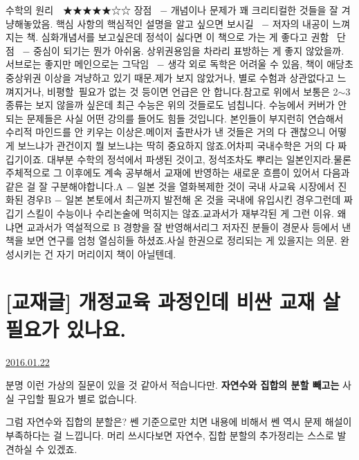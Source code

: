 수학의 원리  ★★★★★☆☆
장점  $-$ 개념이나 문제가 꽤 크리티컬한 것들을 잘 겨냥해놓았음. 핵심 사항의 핵심적인 설명을 알고 싶으면 보시길  $-$ 저자의 내공이 느껴지는 책. 심화개념서를 보고싶은데 정석이 싫다면 이 책으로 가는 게 좋다고 권함  단점  $-$ 중심이 되기는 뭔가 아쉬움. 상위권용임을 차라리 표방하는 게 좋지 않았을까. 서브로는 좋지만 메인으로는 그닥임  $-$ 생각 외로 독학은 어려울 수 있음, 책이 애당초 중상위권 이상을 겨냥하고 있기 때문.제가 보지 않았거나, 별로 수험과 상관없다고 느껴지거나, 비평할 필요가 없는 것 등이면 언급은 안 합니다.참고로 위에서 보통은 2$\sim$3 종류는 보지 않을까 싶은데 최근 수능은 위의 것들로도 넘칩니다. 수능에서 커버가 안 되는 문제들은 사실 어떤 강의를 들어도 힘들 것입니다. 본인들이 부지런히 연습해서 수리적 마인드를 안 키우는 이상은.메이저 출판사가 낸 것들은 거의 다 괜찮으니 어떻게 보느냐가 관건이지 뭘 보느냐는 딱히 중요하지 않죠.어차피 국내수학은 거의 다 짜깁기이죠. 대부분 수학의 정석에서 파생된 것이고, 정석조차도 뿌리는 일본인지라.물론 주체적으로 그 이후에도 계속 공부해서 교재에 반영하는 새로운 흐름이 있어서 다음과 같은 걸 잘 구분해야합니다.A $-$ 일본 것을 열화복제한 것이 국내 사교육 시장에서 진화된 경우B $-$ 일본 본토에서 최근까지 발전해 온 것을 국내에 유입시킨 경우그런데 짜깁기 스킬이 수능이나 수리논술에 먹히지는 않죠.교과서가 재부각된 게 그런 이유. 왜냐면 교과서가 역설적으로 B 경향을 잘 반영해서리그 저자진 분들이 경문사 등에서 낸 책을 보면 연구를 엄청 열심히들 하셨죠.사실 한권으로 정리되는 게 있을지는 의문. 완성시키는 건 자기 머리이지 책이 아닐텐데.
\vspace{5mm}







\section{[교재글] 개정교육 과정인데 비싼 교재 살 필요가 있나요.}
\href{https://www.kockoc.com/Apoc/605445}{2016.01.22}

\vspace{5mm}

분명 이런 가상의 질문이 있을 것 같아서 적습니다만.
\textbf{자연수와 집합의 분할 빼고는} 사실 구입할 필요가 별로 없습니다.
\vspace{5mm}

그럼 자연수와 집합의 분할은?
쎈 기준으로만 치면 내용에 비해서 쎈 역시 문제 해설이 부족하다는 걸 느낍니다.
머리 쓰시다보면 자연수, 집합 분할의 추가정리는 스스로 발견하실 수 있겠죠.
\vspace{5mm}


